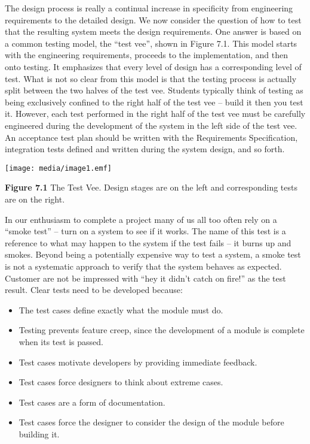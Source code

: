 The design process is really a continual increase in specificity from
engineering requirements to the detailed design. We now consider the
question of how to test that the resulting system meets the design
requirements. One answer is based on a common testing model, the ``test
vee'', shown in Figure 7.1. This model starts with the engineering
requirements, proceeds to the implementation, and then onto testing. It
emphasizes that every level of design has a corresponding level of test.
What is not so clear from this model is that the testing process is
actually split between the two halves of the test vee. Students
typically think of testing as being exclusively confined to the right
half of the test vee -- build it then you test it. However, each test
performed in the right half of the test vee must be carefully engineered
during the development of the system in the left side of the test vee.
An acceptance test plan should be written with the Requirements
Specification, integration tests defined and written during the system
design, and so forth.

\texttt{[image: media/image1.emf]}

\textbf{Figure 7.1} The Test Vee. Design stages are on the left and
corresponding tests are on the right.

In our enthusiasm to complete a project many of us all too often rely on
a ``smoke test'' -- turn on a system to see if it works. The name of
this test is a reference to what may happen to the system if the test
fails -- it burns up and smokes. Beyond being a potentially expensive
way to test a system, a smoke test is not a systematic approach to
verify that the system behaves as expected. Customer are not be
impressed with ``hey it didn't catch on fire!'' as the test result.
Clear tests need to be developed because:

\begin{itemize}
\item
  The test cases define exactly what the module must do.
\item
  Testing prevents feature creep, since the development of a module is
  complete when its test is passed.
\item
  Test cases motivate developers by providing immediate feedback.
\item
  Test cases force designers to think about extreme cases.
\item
  Test cases are a form of documentation.
\item
  Test cases force the designer to consider the design of the module
  before building it.
\end{itemize}

